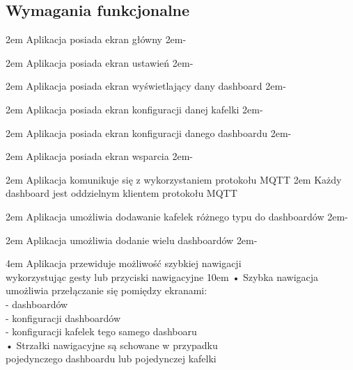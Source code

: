 \newpage

\subsection{Wymagania funkcjonalne}{}

{2em}{
    Aplikacja posiada ekran główny
}
{2em}{-}

{2em}{
    Aplikacja posiada ekran ustawień
}
{2em}{-}

{2em}{
    Aplikacja posiada ekran wyświetlający dany dashboard
}
{2em}{-}

{2em}{
    Aplikacja posiada ekran konfiguracji danej kafelki
}
{2em}{-}

{2em}{
    Aplikacja posiada ekran konfiguracji danego dashboardu
}
{2em}{-}

{2em}{
    Aplikacja posiada ekran wsparcia
}
{2em}{-}

{2em}{
    Aplikacja komunikuje się z wykorzystaniem protokołu MQTT
}
{2em}{
    Każdy dashboard jest oddzielnym klientem protokołu MQTT
}

{2em}{
    Aplikacja umożliwia dodawanie kafelek różnego typu do dashboardów
}
{2em}{-}

{2em}{
    Aplikacja umożliwia dodanie wielu dashboardów
}
{2em}{-}

{4em}{
    Aplikacja przewiduje możliwość szybkiej nawigacji\\
    wykorzystując gesty lub przyciski nawigacyjne
}
{10em}{
    • Szybka nawigacja umożliwia przełączanie się pomiędzy ekranami:\\
    - dashboardów\\
    - konfiguracji dashboardów\\
    - konfiguracji kafelek tego samego dashboaru\\

    • Strzałki nawigacyjne są schowane w przypadku\\
    \hspace*{0.5em} pojedynczego dashboardu lub pojedynczej kafelki
}

